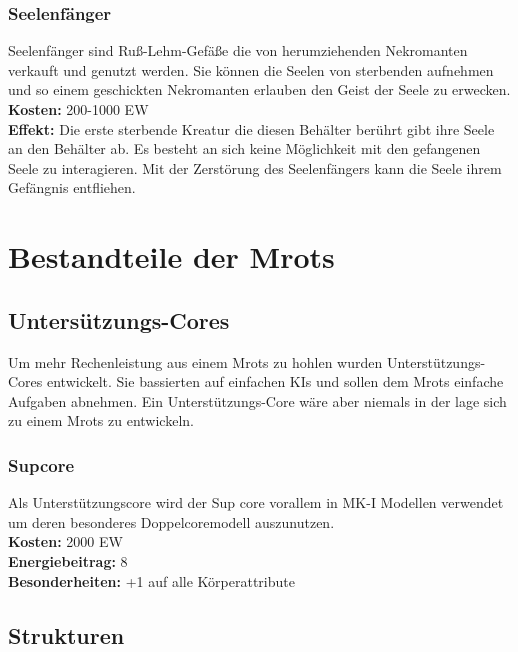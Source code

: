 \subsubsection*{Seelenfänger} \label{ar:seelenfänger}
Seelenfänger sind Ruß-Lehm-Gefäße die von herumziehenden Nekromanten verkauft und genutzt werden. Sie können die Seelen von sterbenden aufnehmen und so einem geschickten Nekromanten erlauben den Geist der Seele zu erwecken.\\
\textbf{Kosten:} 200-1000 EW\\
\textbf{Effekt:} Die erste sterbende Kreatur die diesen Behälter berührt gibt ihre Seele an den Behälter ab. Es besteht an sich keine Möglichkeit mit den gefangenen Seele zu interagieren. Mit der Zerstörung des Seelenfängers kann die Seele ihrem Gefängnis entfliehen.


\section{Bestandteile der Mrots} \label{ent:mrots}

\subsection*{Untersützungs-Cores} \label{core}
Um mehr Rechenleistung aus einem Mrots zu hohlen wurden Unterstützungs-Cores entwickelt. Sie bassierten auf einfachen KIs und sollen dem Mrots einfache Aufgaben abnehmen. Ein Unterstützungs-Core wäre aber niemals in der lage sich zu einem Mrots zu entwickeln.

\subsubsection*{Supcore}\label{Supcore}
Als Unterstützungscore wird der Sup core vorallem in MK-I Modellen verwendet um deren besonderes Doppelcoremodell auszunutzen.\\
\textbf{Kosten:} 2000 EW\\
\textbf{Energiebeitrag:} 8 \\
\textbf{Besonderheiten:} +1 auf alle Körperattribute


\subsection*{Strukturen}

